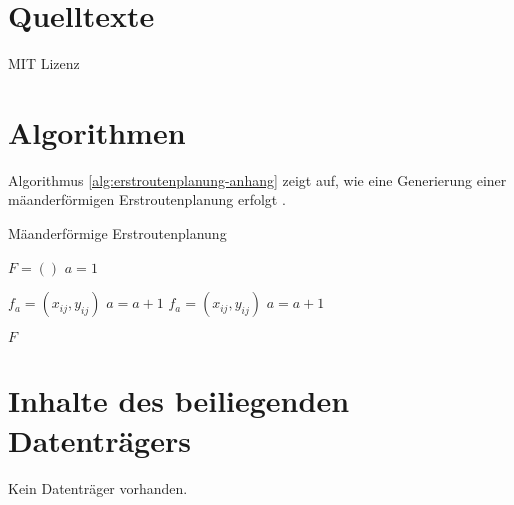 \label{chap:anhang}


\section{Quelltexte}
\label{sec:quelltexte}


\begin{code}
  
  \caption{MIT Lizenz}
  \label{lst:mitlizenz}
\end{code}


\section{Algorithmen}

Algorithmus \ref{alg:erstroutenplanung-anhang} zeigt auf, wie eine Generierung einer mäanderförmigen Erstroutenplanung erfolgt \citep[S.~42]{Bachelorthesis.2016}.

\begin{algorithm}
  \caption{Mäanderförmige Erstroutenplanung}
  \label{alg:erstroutenplanung-anhang}
  \begin{algorithmic}[1]
    \State $F=()$
    \State $a=1$

          \State $f_a = (x_{ij}, y_{ij})$
          \State $a=a+1$
        \EndFor
      \Else
          \State $f_a = (x_{ij}, y_{ij})$
          \State $a=a+1$
        \EndFor
      \EndIf
    \EndFor

    \State \Return $F$

    \EndProcedure
  \end{algorithmic}
\end{algorithm}


\section{Inhalte des beiliegenden Datenträgers}
\label{sec:quelltexte}
Kein Datenträger vorhanden.
